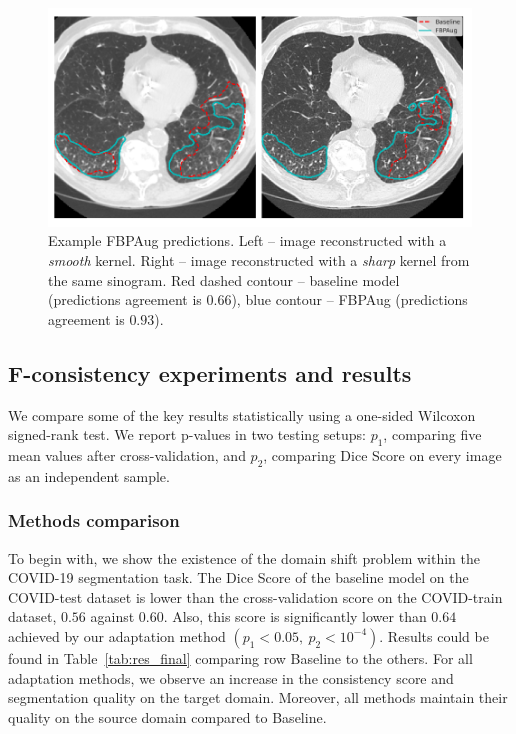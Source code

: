 \begin{figure}[h]
	\centering
	\includegraphics[width=\textwidth]{Dissertation/Figures/3_ct/contours_new.png}
	\caption{Example FBPAug predictions. Left -- image reconstructed with a \textit{smooth} kernel. Right -- image reconstructed with a \textit{sharp} kernel from the same sinogram. Red dashed contour -- baseline model (predictions agreement is $0.66$), blue contour -- FBPAug (predictions agreement is $0.93$).}
	\label{fig:fbpaug_pred}
\end{figure}


\subsection{F-consistency experiments and results}

We compare some of the key results statistically using a one-sided Wilcoxon signed-rank test. We report p-values in two testing setups: $p_1$, comparing five mean values after cross-validation, and $p_2$, comparing Dice Score on every image as an independent sample.


\subsubsection{Methods comparison}

To begin with, we show the existence of the domain shift problem within the COVID-19 segmentation task. The Dice Score of the baseline model on the COVID-test dataset is lower than the cross-validation score on the COVID-train dataset, $0.56$ against $0.60$. Also, this score is significantly lower than $0.64$ achieved by our adaptation method $\left(p_1 < 0.05,\: p_2 < 10^{-4} \right)$. Results could be found in Table~\ref{tab:res_final} comparing row Baseline to the others. For all adaptation methods, we observe an increase in the consistency score and segmentation quality on the target domain. Moreover, all methods maintain their quality on the source domain compared to Baseline.

